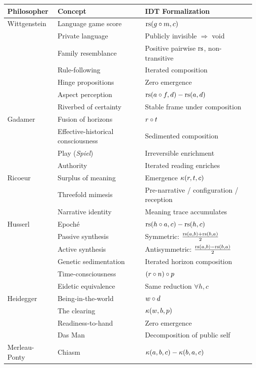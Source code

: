 \begin{center}
\small
\begin{tabular}{lll}
\textbf{Philosopher} & \textbf{Concept} & \textbf{IDT Formalization} \\
\hline
Wittgenstein & Language game score & $\mathrm{rs}(g \circ m, c)$ \\
& Private language & Publicly invisible $\Rightarrow$ void \\
& Family resemblance & Positive pairwise $\mathrm{rs}$, non-transitive \\
& Rule-following & Iterated composition \\
& Hinge propositions & Zero emergence \\
& Aspect perception & $\mathrm{rs}(a \circ f, d) - \mathrm{rs}(a, d)$ \\
& Riverbed of certainty & Stable frame under composition \\
\hline
Gadamer & Fusion of horizons & $r \circ t$ \\
& Effective-historical consciousness & Sedimented composition \\
& Play (\textit{Spiel}) & Irreversible enrichment \\
& Authority & Iterated reading enriches \\
\hline
Ricoeur & Surplus of meaning & Emergence $\kappa(r, t, c)$ \\
& Threefold mimesis & Pre-narrative / configuration / reception \\
& Narrative identity & Meaning trace accumulates \\
\hline
Husserl & Epoch\'e & $\mathrm{rs}(h \circ a, c) - \mathrm{rs}(h, c)$ \\
& Passive synthesis & Symmetric: $\frac{\mathrm{rs}(a,b)+\mathrm{rs}(b,a)}{2}$ \\
& Active synthesis & Antisymmetric: $\frac{\mathrm{rs}(a,b)-\mathrm{rs}(b,a)}{2}$ \\
& Genetic sedimentation & Iterated horizon composition \\
& Time-consciousness & $(r \circ n) \circ p$ \\
& Eidetic equivalence & Same reduction $\forall h, c$ \\
\hline
Heidegger & Being-in-the-world & $w \circ d$ \\
& The clearing & $\kappa(w, b, p)$ \\
& Readiness-to-hand & Zero emergence \\
& Das Man & Decomposition of public self \\
\hline
Merleau-Ponty & Chiasm & $\kappa(a,b,c) - \kappa(b,a,c)$ \\

\end{tabular}
\end{center}
